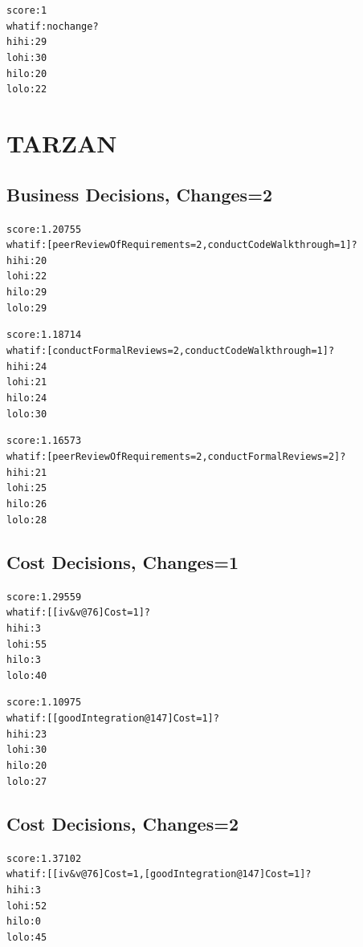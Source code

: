 \documentclass{article}
\begin{document}
{\footnotesize \begin{alltt}
          score :    1
        what if : no change?
           hihi :   29%
           lohi :   30%
           hilo :   20%
           lolo :   22%
\end{alltt}}

\pagebreak
\section{TARZAN}

\subsection{Business Decisions, Changes=2}

{\footnotesize \begin{alltt}

          score : 1.20755
        what if : [peerReviewOfRequirements=2, conductCodeWalkthrough=1]?
           hihi :   20%
           lohi :   22%
           hilo :   29%
           lolo :   29%

          score : 1.18714
        what if : [conductFormalReviews=2, conductCodeWalkthrough=1]?
           hihi :   24%
           lohi :   21%
           hilo :   24%
           lolo :   30%

          score : 1.16573
        what if : [peerReviewOfRequirements=2, conductFormalReviews=2]?
           hihi :   21%
           lohi :   25%
           hilo :   26%
           lolo :   28%
\end{alltt}}

\subsection{Cost Decisions, Changes=1}


{\footnotesize \begin{alltt}
          score : 1.29559
        what if : [[iv&v@76]Cost=1]?
           hihi :    3%
           lohi :   55%
           hilo :    3%
           lolo :   40%

          score : 1.10975
        what if : [[goodIntegration@147]Cost=1]?
           hihi :   23%
           lohi :   30%
           hilo :   20%
           lolo :   27%
\end{alltt}}
\subsection{Cost Decisions, Changes=2}
{\footnotesize \begin{alltt}
          score : 1.37102
        what if : [[iv&v@76]Cost=1, [goodIntegration@147]Cost=1]?
           hihi :    3%
           lohi :   52%
           hilo :    0%
           lolo :   45%
           \end{alltt}}
\end{document}
